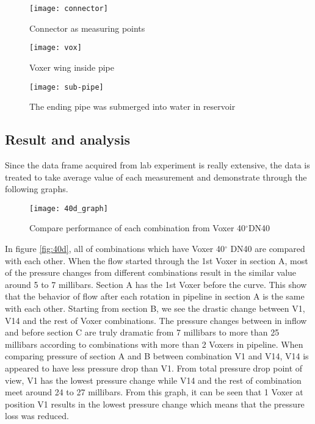 \begin{figure}[!htb]
   \begin{minipage}{0.48\textwidth}
     \centering
     \texttt{[image: connector]}
     \caption{Connector as measuring points}\label{fig:connector}
   \end{minipage}\hfill
   \begin {minipage}{0.48\textwidth}
     \centering
     \texttt{[image: vox]}
     \caption{Voxer wing inside pipe}\label{fig:vox}
   \end{minipage}
\end{figure}

\begin{figure}[h]
  \centering
  \texttt{[image: sub-pipe]}
  \caption{ The ending pipe was submerged into water in reservoir}
  \label{fig:subpipe}
\end{figure}

\subsection{Result and analysis}

Since the data frame acquired from lab experiment is really extensive, the data is treated to take average value of each measurement and demonstrate through the following graphs.

\begin{figure}[h]
  \centering
  \texttt{[image: 40d\_graph]}
  \caption{ Compare performance of each combination from Voxer 40$^{\circ}$DN40}
  \label{fig:40d}
\end{figure}

In figure \vref{fig:40d}, all of combinations which have Voxer 40$^{\circ}$ DN40 are compared with each other. When the flow started through the 1st Voxer in section A, most of the pressure changes from different combinations result in the similar value around 5 to 7 millibars. Section A has the 1st Voxer before the curve. This show that the behavior of flow after each rotation in pipeline in section A is the same with each other. Starting from section B, we see the drastic change between V1, V14 and the rest of Voxer combinations. The pressure changes between in inflow and before section C are truly dramatic from 7 millibars to more than 25 millibars according to combinations with more than 2 Voxers in pipeline. When comparing pressure of section A and B between combination V1 and V14, V14 is appeared to have less pressure drop than V1. From total pressure drop point of view, V1 has the lowest pressure change while V14 and the rest of combination meet around 24 to 27 millibars. From this graph, it can be seen that 1 Voxer at position V1 results in the lowest pressure change which means that the pressure loss was reduced. 

